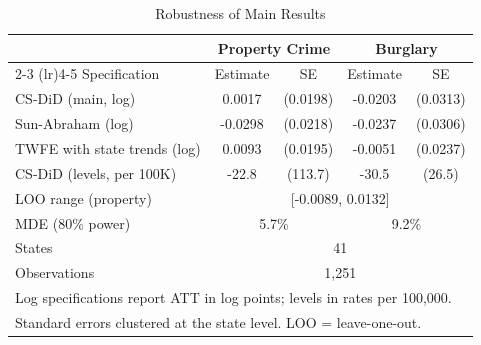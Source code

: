\begin{table}[htbp]
\centering
\caption{Robustness of Main Results}
\label{tab:robustness}
\begin{tabular}{lcccc}
\toprule
 & \multicolumn{2}{c}{Property Crime} & \multicolumn{2}{c}{Burglary} \\
\cmidrule(lr){2-3} \cmidrule(lr){4-5}
Specification & Estimate & SE & Estimate & SE \\
\midrule
CS-DiD (main, log) & 0.0017 & (0.0198) & -0.0203 & (0.0313) \\
Sun-Abraham (log) & -0.0298 & (0.0218) & -0.0237 & (0.0306) \\
TWFE with state trends (log) & 0.0093 & (0.0195) & -0.0051 & (0.0237) \\
CS-DiD (levels, per 100K) & -22.8 & (113.7) & -30.5 & (26.5) \\
\midrule
LOO range (property) & \multicolumn{4}{c}{[-0.0089, 0.0132]} \\
MDE (80\% power) & \multicolumn{2}{c}{5.7\%} & \multicolumn{2}{c}{9.2\%} \\
\midrule
States & \multicolumn{4}{c}{41} \\
Observations & \multicolumn{4}{c}{1,251} \\
\bottomrule
\multicolumn{5}{l}{\footnotesize Log specifications report ATT in log points; levels in rates per 100,000.} \\
\multicolumn{5}{l}{\footnotesize Standard errors clustered at the state level. LOO = leave-one-out.} \\
\end{tabular}
\end{table}
